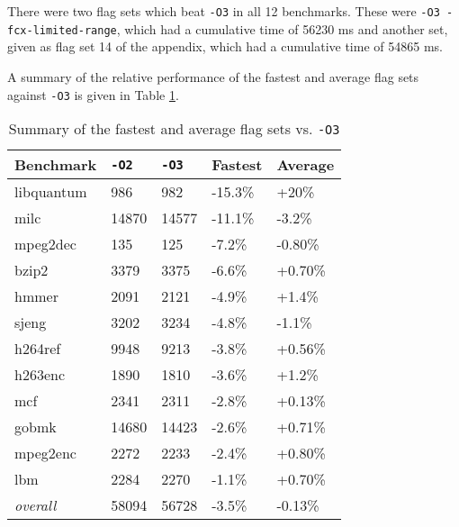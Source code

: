 \documentclass[twocolumn, 10pt]{article}
\begin{document}
There were two flag sets which beat \texttt{-O3} in all 12 benchmarks. These were {\texttt{-O3 -fcx-limited-range}}, which had a cumulative time of 56230 ms and another set, given as flag set 14 of the appendix,
which had a cumulative time of 54865 ms.

A summary of the relative performance of the fastest and average flag sets against \texttt{-O3} is given in Table \ref{tab:sum}.

\begin{table}[H]
    \centering
    \begin{tabular}{lllll}
        \toprule
        Benchmark & \texttt{-O2} & \texttt{-O3} & Fastest & Average \\
        \midrule
        libquantum & 986 & 982 & -15.3\% & +20\%\\ 
        milc & 14870 & 14577 & -11.1\% & -3.2\%\\
        mpeg2dec & 135 & 125 & -7.2\% & -0.80\%\\
        bzip2 & 3379 & 3375 & -6.6\% & +0.70\%\\
        hmmer & 2091 & 2121 & -4.9\% & +1.4\%\\
        sjeng & 3202 & 3234 & -4.8\% & -1.1\%\\
        h264ref & 9948 & 9213 & -3.8\% & +0.56\%\\
        h263enc & 1890 & 1810 & -3.6\% & +1.2\%\\
        mcf & 2341 & 2311 & -2.8\% & +0.13\%\\
        gobmk & 14680 & 14423 & -2.6\% & +0.71\%\\
        mpeg2enc & 2272 & 2233 & -2.4\% & +0.80\%\\
        lbm & 2284 & 2270 & -1.1\% & +0.70\%\\
        \midrule
        \emph{overall} & 58094 & 56728 & -3.5\% & -0.13\%\\
        \bottomrule
    \end{tabular}
    \caption{Summary of the fastest and average flag sets vs. \texttt{-O3}}
    \label{tab:sum}
\end{table}
\end{document}
